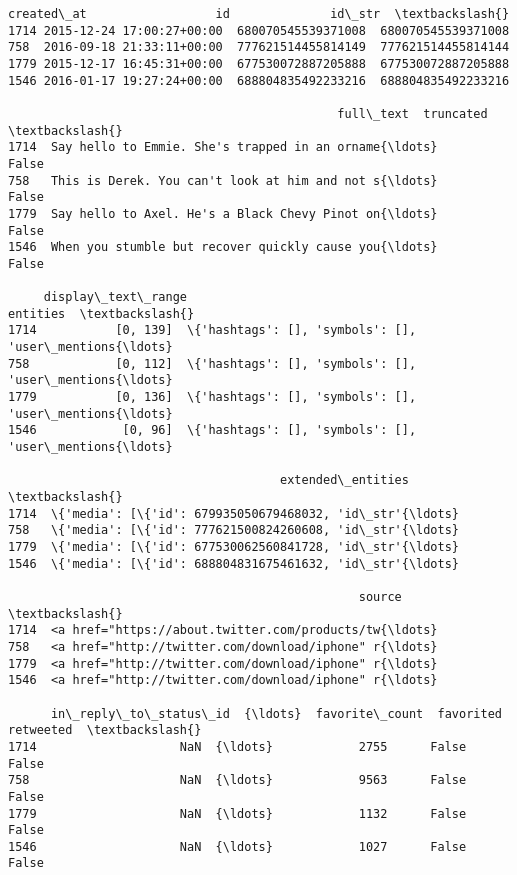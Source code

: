 \documentclass[11pt]{article}
\makeatletter
\newcommand{\boxspacing}{\kern\kvtcb@left@rule\kern\kvtcb@boxsep}
\newcommand{\prompt}[4]{
        {\ttfamily\llap{{\color{#2}[#3]:\hspace{3pt}#4}}\vspace{-\baselineskip}}
    }
\makeatother
\begin{document}
            \begin{tcolorbox}[breakable, size=fbox, boxrule=.5pt, pad at break*=1mm, opacityfill=0]
\prompt{Out}{outcolor}{33}{\boxspacing}
\begin{Verbatim}[commandchars=\\\{\}]
                    created\_at                  id              id\_str  \textbackslash{}
1714 2015-12-24 17:00:27+00:00  680070545539371008  680070545539371008
758  2016-09-18 21:33:11+00:00  777621514455814149  777621514455814144
1779 2015-12-17 16:45:31+00:00  677530072887205888  677530072887205888
1546 2016-01-17 19:27:24+00:00  688804835492233216  688804835492233216

                                              full\_text  truncated  \textbackslash{}
1714  Say hello to Emmie. She's trapped in an orname{\ldots}      False
758   This is Derek. You can't look at him and not s{\ldots}      False
1779  Say hello to Axel. He's a Black Chevy Pinot on{\ldots}      False
1546  When you stumble but recover quickly cause you{\ldots}      False

     display\_text\_range                                           entities  \textbackslash{}
1714           [0, 139]  \{'hashtags': [], 'symbols': [], 'user\_mentions{\ldots}
758            [0, 112]  \{'hashtags': [], 'symbols': [], 'user\_mentions{\ldots}
1779           [0, 136]  \{'hashtags': [], 'symbols': [], 'user\_mentions{\ldots}
1546            [0, 96]  \{'hashtags': [], 'symbols': [], 'user\_mentions{\ldots}

                                      extended\_entities  \textbackslash{}
1714  \{'media': [\{'id': 679935050679468032, 'id\_str'{\ldots}
758   \{'media': [\{'id': 777621500824260608, 'id\_str'{\ldots}
1779  \{'media': [\{'id': 677530062560841728, 'id\_str'{\ldots}
1546  \{'media': [\{'id': 688804831675461632, 'id\_str'{\ldots}

                                                 source  \textbackslash{}
1714  <a href="https://about.twitter.com/products/tw{\ldots}
758   <a href="http://twitter.com/download/iphone" r{\ldots}
1779  <a href="http://twitter.com/download/iphone" r{\ldots}
1546  <a href="http://twitter.com/download/iphone" r{\ldots}

      in\_reply\_to\_status\_id  {\ldots}  favorite\_count  favorited  retweeted  \textbackslash{}
1714                    NaN  {\ldots}            2755      False      False
758                     NaN  {\ldots}            9563      False      False
1779                    NaN  {\ldots}            1132      False      False
1546                    NaN  {\ldots}            1027      False      False


\end{Verbatim}
\end{tcolorbox}
\end{document}
